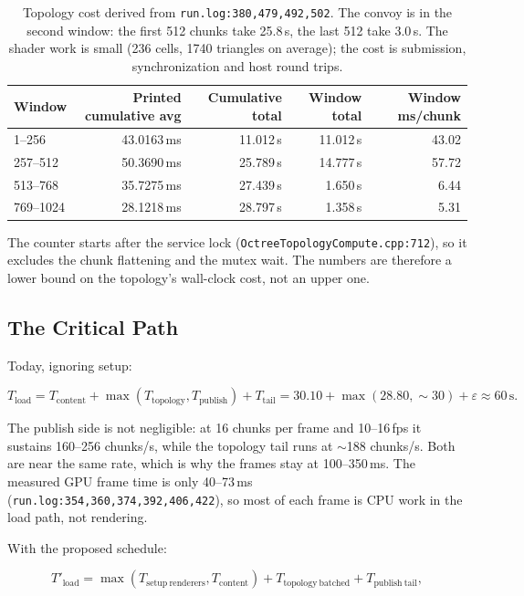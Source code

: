 \documentclass[11pt,a4paper]{article}
\begin{document}
\begin{table}[h]
\centering
\small
\begin{tabular}{@{}lrrrr@{}}
\toprule
\textbf{Window} & \textbf{Printed cumulative avg} & \textbf{Cumulative total} & \textbf{Window total} & \textbf{Window ms/chunk} \\
\midrule
1--256   & 43.0163\,ms & 11.012\,s & 11.012\,s & 43.02 \\
257--512 & 50.3690\,ms & 25.789\,s & 14.777\,s & 57.72 \\
513--768 & 35.7275\,ms & 27.439\,s & 1.650\,s  & 6.44 \\
769--1024& 28.1218\,ms & 28.797\,s & 1.358\,s  & 5.31 \\
\bottomrule
\end{tabular}
\caption{Topology cost derived from \texttt{run.log:380,479,492,502}. The
convoy is in the second window: the first 512 chunks take 25.8\,s, the last
512 take 3.0\,s. The shader work is small (236 cells, 1740 triangles on
average); the cost is submission, synchronization and host round trips.}
\end{table}

The counter starts after the service lock (\texttt{OctreeTopologyCompute.cpp:712}),
so it excludes the chunk flattening and the mutex wait. The numbers are
therefore a lower bound on the topology's wall-clock cost, not an upper one.

\subsection{The Critical Path}

Today, ignoring setup:

\begin{equation}
T_{\mathrm{load}} = T_{\mathrm{content}} + \max(T_{\mathrm{topology}},
T_{\mathrm{publish}}) + T_{\mathrm{tail}}
= 30.10 + \max(28.80, \sim\!30) + \varepsilon \approx 60\,\mathrm{s}.
\end{equation}

The publish side is not negligible: at 16 chunks per frame and 10--16\,fps it
sustains 160--256 chunks/s, while the topology tail runs at $\sim$188
chunks/s. Both are near the same rate, which is why the frames stay at
100--350\,ms. The measured GPU frame time is only 40--73\,ms
(\texttt{run.log:354,360,374,392,406,422}), so most of each frame is CPU work
in the load path, not rendering.

With the proposed schedule:

\begin{equation}
T'_{\mathrm{load}} = \max(T_{\mathrm{setup\ renderers}},
T_{\mathrm{content}}) + T_{\mathrm{topology\ batched}} +
T_{\mathrm{publish\ tail}},
\end{equation}
\end{document}

